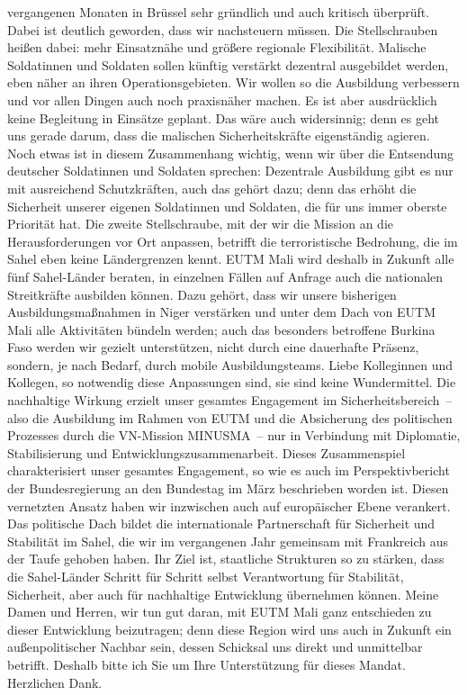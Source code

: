 \documentclass{article}
\begin{document}
vergangenen Monaten in Brüssel sehr gründlich und auch kritisch überprüft. Dabei ist deutlich geworden, dass wir nachsteuern müssen. Die Stellschrauben heißen dabei: mehr Einsatznähe und größere regionale Flexibilität. Malische Soldatinnen und Soldaten sollen künftig verstärkt dezentral ausgebildet werden, eben näher an ihren Operationsgebieten. Wir wollen so die Ausbildung verbessern und vor allen Dingen auch noch praxisnäher machen. Es ist aber ausdrücklich keine Begleitung in Einsätze geplant. Das wäre auch widersinnig; denn es geht uns gerade darum, dass die malischen Sicherheitskräfte eigenständig agieren. Noch etwas ist in diesem Zusammenhang wichtig, wenn wir über die Entsendung deutscher Soldatinnen und Soldaten sprechen: Dezentrale Ausbildung gibt es nur mit ausreichend Schutzkräften, auch das gehört dazu; denn das erhöht die Sicherheit unserer eigenen Soldatinnen und Soldaten, die für uns immer oberste Priorität hat.  Die zweite Stellschraube, mit der wir die Mission an die Herausforderungen vor Ort anpassen, betrifft die terroristische Bedrohung, die im Sahel eben keine Ländergrenzen kennt. EUTM Mali wird deshalb in Zukunft alle fünf Sahel-Länder beraten, in einzelnen Fällen auf Anfrage auch die nationalen Streitkräfte ausbilden können. Dazu gehört, dass wir unsere bisherigen Ausbildungsmaßnahmen in Niger verstärken und unter dem Dach von EUTM Mali alle Aktivitäten bündeln werden; auch das besonders betroffene Burkina Faso werden wir gezielt unterstützen, nicht durch eine dauerhafte Präsenz, sondern, je nach Bedarf, durch mobile Ausbildungsteams. Liebe Kolleginnen und Kollegen, so notwendig diese Anpassungen sind, sie sind keine Wundermittel. Die nachhaltige Wirkung erzielt unser gesamtes Engagement im Sicherheitsbereich – also die Ausbildung im Rahmen von EUTM und die Absicherung des politischen Prozesses durch die VN-Mission MINUSMA – nur in Verbindung mit Diplomatie, Stabilisierung und Entwicklungszusammenarbeit. Dieses Zusammenspiel charakterisiert unser gesamtes Engagement, so wie es auch im Perspektivbericht der Bundesregierung an den Bundestag im März beschrieben worden ist. Diesen vernetzten Ansatz haben wir inzwischen auch auf europäischer Ebene verankert. Das politische Dach bildet die internationale Partnerschaft für Sicherheit und Stabilität im Sahel, die wir im vergangenen Jahr gemeinsam mit Frankreich aus der Taufe gehoben haben. Ihr Ziel ist, staatliche Strukturen so zu stärken, dass die Sahel-Länder Schritt für Schritt selbst Verantwortung für Stabilität, Sicherheit, aber auch für nachhaltige Entwicklung übernehmen können. Meine Damen und Herren, wir tun gut daran, mit EUTM Mali ganz entschieden zu dieser Entwicklung beizutragen; denn diese Region wird uns auch in Zukunft ein außenpolitischer Nachbar sein, dessen Schicksal uns direkt und unmittelbar betrifft. Deshalb bitte ich Sie um Ihre Unterstützung für dieses Mandat. Herzlichen Dank.  
\end{document}
